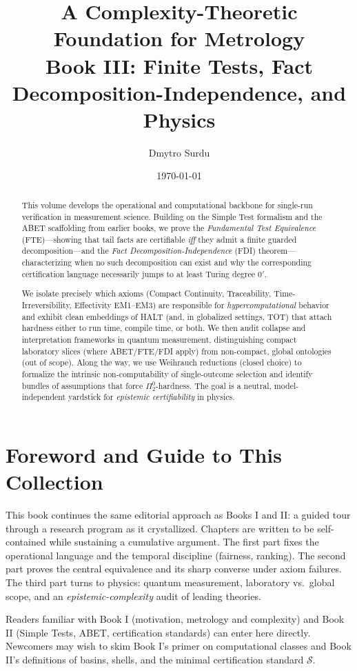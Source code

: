 \documentclass[12pt]{article}
\title{\textbf{A Complexity-Theoretic Foundation for Metrology \\ \large Book III: Finite Tests, Fact Decomposition-Independence, and Physics}}
\author{Dmytro Surdu}
\date{\today}
\begin{document}
\maketitle

\begin{abstract}
\noindent
This volume develops the operational and computational backbone for single-run verification in measurement science. Building on the Simple Test formalism and the ABET scaffolding from earlier books, we prove the \emph{Fundamental Test Equivalence} (FTE)—showing that tail facts are certifiable \emph{iff} they admit a finite guarded decomposition—and the \emph{Fact Decomposition-Independence} (FDI) theorem—characterizing when no such decomposition can exist and why the corresponding certification language necessarily jumps to at least Turing degree $0'$. 

We isolate precisely which axioms (Compact Continuity, Traceability, Time-Irreversibility, Effectivity EM1–EM3) are responsible for \emph{hypercomputational} behavior and exhibit clean embeddings of \textsc{HALT} (and, in globalized settings, \textsc{TOT}) that attach hardness either to run time, compile time, or both. We then audit collapse and interpretation frameworks in quantum measurement, distinguishing compact laboratory slices (where ABET/FTE/FDI apply) from non-compact, global ontologies (out of scope). Along the way, we use Weihrauch reductions (closed choice) to formalize the intrinsic non-computability of single-outcome selection and identify bundles of assumptions that force $\Pi^0_2$-hardness. The goal is a neutral, model-independent yardstick for \emph{epistemic certifiability} in physics.
\end{abstract}

\section*{Foreword and Guide to This Collection}
This book continues the same editorial approach as Books I and II: a guided tour through a research program as it crystallized. Chapters are written to be self-contained while sustaining a cumulative argument. The first part fixes the operational language and the temporal discipline (fairness, ranking). The second part proves the central equivalence and its sharp converse under axiom failures. The third part turns to physics: quantum measurement, laboratory vs.\ global scope, and an \emph{epistemic-complexity} audit of leading theories. 

Readers familiar with Book I (motivation, metrology and complexity) and Book II (Simple Tests, ABET, certification standards) can enter here directly. Newcomers may wish to skim Book I’s primer on computational classes and Book II’s definitions of basins, shells, and the minimal certification standard $\mathcal S$.
\end{document}
